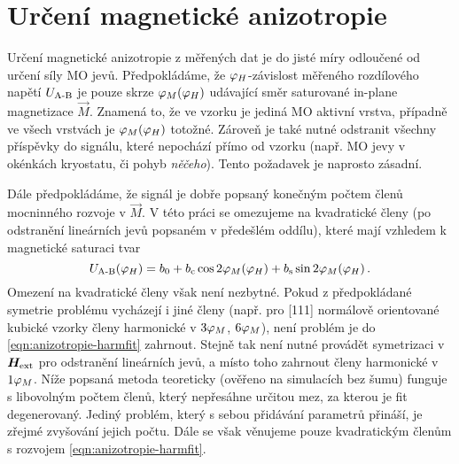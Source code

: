 \section{Určení magnetické anizotropie}
\label{chap:urceni-magneticke-anizotropie}

Určení magnetické anizotropie z měřených dat je do jisté míry odloučené od určení síly MO jevů.
Předpokládáme, že $\varphi_H$-závislost měřeného rozdílového napětí $U_\textrm{A-B}$ je pouze skrze $\varphi_M(\varphi_H)$ udávající směr saturované in-plane magnetizace $\vec{M}$.
Znamená to, že ve vzorku je jediná MO aktivní vrstva, případně ve všech vrstvách je $\varphi_M(\varphi_H)$ totožné.
Zároveň je také nutné odstranit všechny příspěvky do signálu, které nepochází přímo od vzorku (např. MO jevy v okénkách kryostatu, či pohyb \emph{něčeho}).
Tento požadavek je naprosto zásadní.

Dále předpokládáme, že signál je dobře popsaný konečným počtem členů mocninného rozvoje v $\vec{M}$.
V této práci se omezujeme na kvadratické členy (po odstranění lineárních jevů popsaném v předešlém oddílu), které mají vzhledem k magnetické saturaci tvar
\begin{equation}
\label{eqn:anizotropie-harmfit}
    U_\textrm{A-B}(\varphi_H) = b_0 + b_\textrm{c} \cos2\varphi_M(\varphi_H) + b_\textrm{s} \sin2\varphi_M(\varphi_H) \,.
\end{equation}
Omezení na kvadratické členy však není nezbytné.
Pokud z předpokládané symetrie problému vycházejí i jiné členy (např. pro [111] normálově orientované kubické vzorky členy harmonické v $3\varphi_M$, $6\varphi_M$), není problém je do \eqref{eqn:anizotropie-harmfit} zahrnout.
Stejně tak není nutné provádět symetrizaci v $\bm{H}_\textrm{ext}$ pro odstranění lineárních jevů, a místo toho zahrnout členy harmonické v $1\varphi_M$.
Níže popsaná metoda teoreticky (ověřeno na simulacích bez šumu) funguje s libovolným počtem členů, který nepřesáhne určitou mez, za kterou je fit degenerovaný.
Jediný problém, který s sebou přidávání parametrů přináší, je zřejmé zvyšování jejich počtu.
Dále se však věnujeme pouze kvadratickým členům s rozvojem \eqref{eqn:anizotropie-harmfit}.

